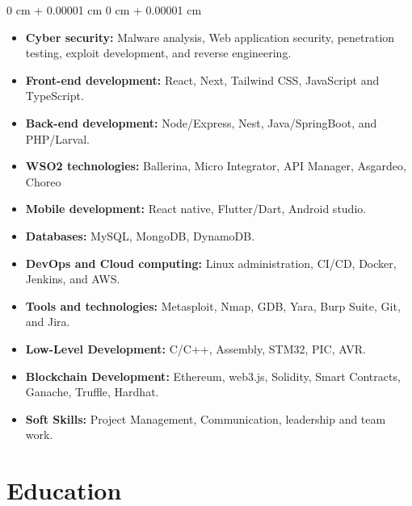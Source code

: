 \documentclass[10pt, letterpaper]{article}
\newenvironment{highlightsforbulletentries}{
    \begin{itemize}[
        topsep=0.10 cm,
        parsep=0.10 cm,
        partopsep=0pt,
        itemsep=0pt,
        leftmargin=10pt
    ]
}{
    \end{itemize}
} %
\newenvironment{onecolentry}{
    \begin{adjustwidth}{
        0 cm + 0.00001 cm
    }{
        0 cm + 0.00001 cm
    }
}{
    \end{adjustwidth}
} %
\begin{document}
    \begin{onecolentry}
        \begin{highlightsforbulletentries}

        \item \textbf{Cyber security:} Malware analysis, Web application security, penetration testing, exploit development, and reverse engineering.

        \item \textbf{Front-end development:} React, Next, Tailwind CSS, JavaScript and TypeScript.

        \item \textbf{Back-end development:} Node/Express, Nest, Java/SpringBoot, and PHP/Larval.

        \item \textbf{WSO2 technologies:}  Ballerina, Micro Integrator, API Manager, Asgardeo, Choreo

        \item \textbf{Mobile development:} React native, Flutter/Dart, Android studio.
        
        \item \textbf{Databases:} MySQL, MongoDB, DynamoDB.
        
        \item \textbf{DevOps and Cloud computing:} Linux administration, CI/CD, Docker, Jenkins, and AWS.
        
        \item \textbf{Tools and technologies:} Metasploit, Nmap, GDB, Yara, Burp Suite, Git, and Jira.

         \item \textbf{Low-Level Development:} C/C++, Assembly, STM32, PIC, AVR.
        
        \item \textbf{Blockchain Development:}  Ethereum, web3.js, Solidity, Smart Contracts, Ganache, Truffle, Hardhat.
        
        \item \textbf{Soft Skills:} Project Management, Communication, leadership and team work.

        \end{highlightsforbulletentries}
    \end{onecolentry}

    \section{Education}
\end{document}

